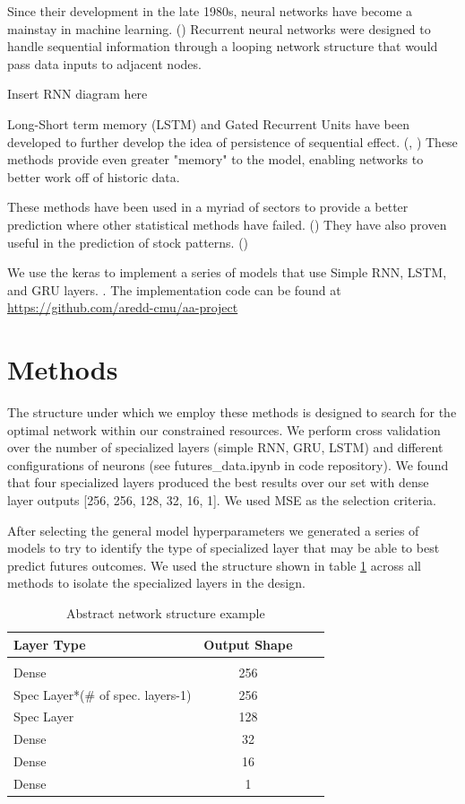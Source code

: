 \documentclass[twoside,11pt]{article}
\begin{document}
Since their development in the late 1980s, neural networks have become a mainstay in machine learning. (\cite{Schmidhuber2015}) Recurrent neural networks were designed to handle sequential information through a looping network structure that would pass data inputs to adjacent nodes. 

Insert RNN diagram here

Long-Short term memory (LSTM) and Gated Recurrent Units have been developed to further develop the idea of persistence of sequential effect. (\cite{Hochreiter1997}, \cite{Chung}) These methods provide even greater "memory" to the model, enabling networks to better work off of historic data. 

These methods have been used in a myriad of sectors to provide a better prediction where other statistical methods have failed. (\cite{Ugurlu2018}) They have also proven useful in the prediction of stock patterns. (\cite{YoungohcYoon}) 

We use the keras to implement a series of models that use Simple RNN, LSTM, and GRU layers. \cite{chollet2015keras}. The implementation code can be found at \url{https://github.com/aredd-cmu/aa-project}

\section{Methods} \label{Methods}

The structure under which we employ these methods is designed to search for the optimal network within our constrained resources. We perform cross validation over the number of specialized layers (simple RNN, GRU, LSTM) and different configurations of neurons (see futures\_data.ipynb in code repository). We found that four specialized layers produced the best results over our set with dense layer outputs [256, 256, 128, 32, 16, 1]. We used MSE as the selection criteria.

After selecting the general model hyperparameters we generated a series of models to try to identify the type of specialized layer that may be able to best predict futures outcomes. We used the structure shown in table \ref{tab:networkstructure} across all methods to isolate the specialized layers in the design.

\begin{table}[htbp]
	\centering
	\begin{tabular}{lclc}
		Layer Type & Output Shape \\
		\hline \\[-11pt]
		Dense & 256 \\
		Spec Layer*(\# of spec. layers-1) & 256\\
		Spec Layer & 128\\
		Dense & 32\\
		Dense & 16\\
		Dense & 1\\
		\hline
	\end{tabular}
	\label{tab:networkstructure}
	\caption{Abstract network structure example}
\end{table}
\end{document}

